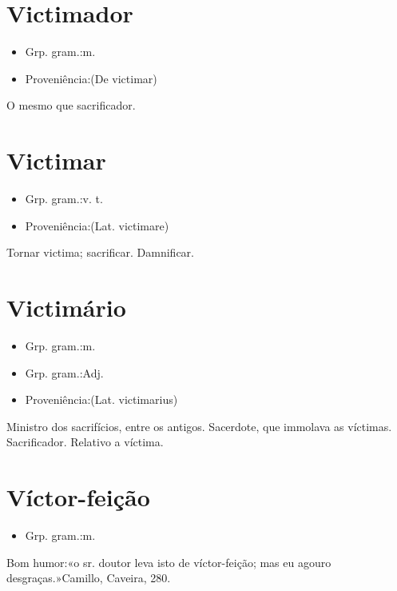 \documentclass{article}
\begin{document}
\section{Victimador}
\begin{itemize}
\item {Grp. gram.:m.}
\end{itemize}
\begin{itemize}
\item {Proveniência:(De \textunderscore victimar\textunderscore )}
\end{itemize}
O mesmo que \textunderscore sacrificador\textunderscore .
\section{Victimar}
\begin{itemize}
\item {Grp. gram.:v. t.}
\end{itemize}
\begin{itemize}
\item {Proveniência:(Lat. \textunderscore victimare\textunderscore )}
\end{itemize}
Tornar victima; sacrificar.
Damnificar.
\section{Victimário}
\begin{itemize}
\item {Grp. gram.:m.}
\end{itemize}
\begin{itemize}
\item {Grp. gram.:Adj.}
\end{itemize}
\begin{itemize}
\item {Proveniência:(Lat. \textunderscore victimarius\textunderscore )}
\end{itemize}
Ministro dos sacrifícios, entre os antigos.
Sacerdote, que immolava as víctimas.
Sacrificador.
Relativo a víctima.
\section{Víctor-feição}
\begin{itemize}
\item {Grp. gram.:m.}
\end{itemize}
Bom humor:«\textunderscore o sr. doutor leva isto de víctor-feição; mas eu agouro desgraças.\textunderscore »Camillo, \textunderscore Caveira\textunderscore , 280.
\end{document}
